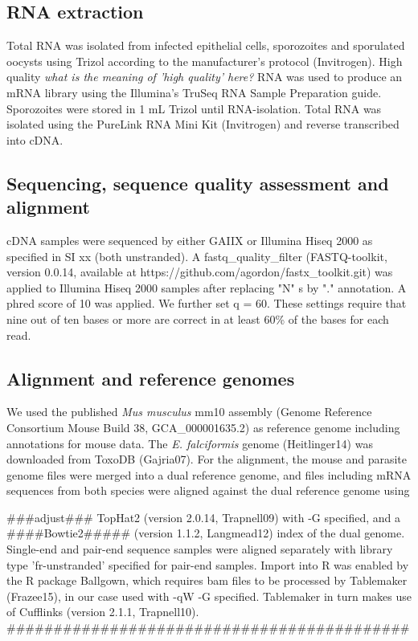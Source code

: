 \documentclass{bmcart}
\begin{document}
\subsection*{RNA extraction}
Total RNA was isolated from infected epithelial cells, sporozoites and
sporulated oocysts using Trizol according to the manufacturer’s
protocol (Invitrogen). High quality \emph{what is the meaning of 'high
  quality' here?}  RNA was used to produce an mRNA library using the
Illumina’s TruSeq RNA Sample Preparation guide. Sporozoites were stored in 1 mL Trizol until
RNA-isolation. Total RNA was isolated using the PureLink RNA Mini Kit
(Invitrogen) and reverse transcribed into cDNA.

\subsection*{Sequencing, sequence quality assessment and alignment}
cDNA samples were sequenced by either GAIIX or Illumina Hiseq 2000 as
specified in SI xx (both unstranded). A fastq\_quality\_filter
(FASTQ-toolkit, version 0.0.14, available at
https://github.com/agordon/fastx\_toolkit.git) was applied to Illumina
Hiseq 2000 samples after replacing "N" s by "." annotation.  A
phred score of 10 was applied. We further set q = 60. These settings
require that nine out of ten bases or more are correct in at least
60\% of the bases for each read.

\subsection*{Alignment and reference genomes}
We used the published \textit{Mus musculus} mm10 assembly (Genome
Reference Consortium Mouse Build 38, GCA\_000001635.2) as reference
genome including annotations for mouse data. The
\textit{E. falciformis} genome (Heitlinger14) was downloaded from
ToxoDB (Gajria07). For the alignment, the mouse and parasite genome
files were merged into a dual reference genome, and files including
mRNA sequences from both species were aligned against the dual
reference genome using 

###adjust### 
TopHat2 (version 2.0.14, Trapnell09) with -G
specified, and a ####Bowtie2##### (version 1.1.2, Langmead12) index of the dual
genome. Single-end and pair-end sequence samples were aligned
separately with library type 'fr-unstranded' specified for pair-end
samples. Import into R was enabled by the R package Ballgown, which
requires bam files to be processed by Tablemaker (Frazee15), in our
case used with -qW -G specified. Tablemaker in turn makes use of
Cufflinks (version 2.1.1, Trapnell10).
###########################################
\end{document}
